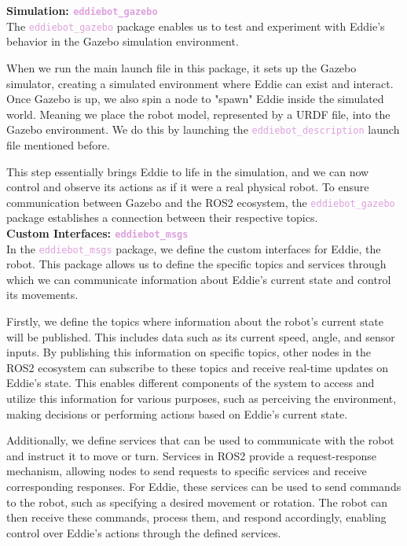 \textbf{Simulation: \textcolor{Plum}{\texttt{\Large eddiebot\_gazebo}}}\\
The \textcolor{Plum}{\texttt{eddiebot\_gazebo}} package enables us to test and experiment with Eddie's behavior in the Gazebo simulation environment. 

When we run the main launch file in this package, it sets up the Gazebo simulator, creating a simulated environment where Eddie can exist and interact.
Once Gazebo is up, we also spin a node to "spawn" Eddie inside the simulated world. Meaning we place the robot model, represented by a URDF file, into the Gazebo environment. We do this by launching the \textcolor{Plum}{\texttt{eddiebot\_description}} launch file mentioned before.

This step essentially brings Eddie to life in the simulation, and we can now control and observe its actions as if it were a real physical robot. To ensure communication between Gazebo and the ROS2 ecosystem, the \textcolor{Plum}{\texttt{eddiebot\_gazebo}} package establishes a connection between their respective topics. \\

\textbf{Custom Interfaces: \textcolor{Plum}{\texttt{\Large eddiebot\_msgs}}}\\
In the \textcolor{Plum}{\texttt{eddiebot\_msgs}} package, we define the custom interfaces for Eddie, the robot. This package allows us to define the specific topics and services through which we can communicate information about Eddie's current state and control its movements.

Firstly, we define the topics where information about the robot's current state will be published. This includes data such as its current speed, angle, and sensor inputs. By publishing this information on specific topics, other nodes in the ROS2 ecosystem can subscribe to these topics and receive real-time updates on Eddie's state. This enables different components of the system to access and utilize this information for various purposes, such as perceiving the environment, making decisions or performing actions based on Eddie's current state.

Additionally, we define services that can be used to communicate with the robot and instruct it to move or turn. Services in ROS2 provide a request-response mechanism, allowing nodes to send requests to specific services and receive corresponding responses. For Eddie, these services can be used to send commands to the robot, such as specifying a desired movement or rotation. The robot can then receive these commands, process them, and respond accordingly, enabling control over Eddie's actions through the defined services.

